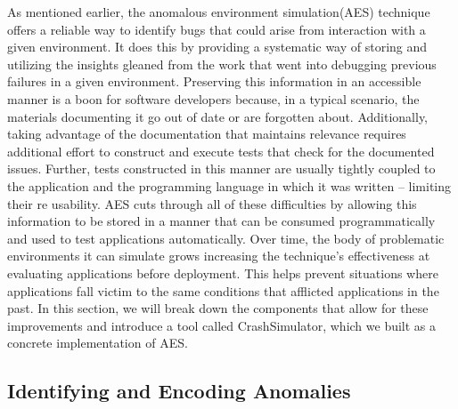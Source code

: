 As mentioned earlier,
the anomalous environment simulation(AES) technique
offers a reliable way to identify bugs
that could arise from interaction with a given environment.
It does this by providing a systematic way of storing and utilizing the
insights gleaned from the work that went into debugging previous failures
in a given environment.
Preserving this information in an accessible manner
is a boon for software developers because,
in a typical scenario, the materials documenting it
go out of date or are forgotten about.
Additionally,
taking advantage of the documentation that maintains relevance
requires additional effort
to construct and execute tests
that check for the documented issues.
Further, tests constructed in this manner are
usually tightly coupled
to the application and the programming language in which it was written --
limiting their re usability.
AES cuts through all of these difficulties by allowing this
information to be stored in a manner that can be consumed
programmatically and used to test applications automatically.
Over time, the body of problematic environments it can simulate
grows increasing the technique's effectiveness at
evaluating applications before deployment.
This helps prevent situations
where applications fall victim to the same conditions
that afflicted applications in the past.
In this section,
we will break down the components
that allow for these improvements
and introduce a tool called CrashSimulator,
which we built as a concrete implementation of AES.


\subsection{Identifying and Encoding Anomalies}

